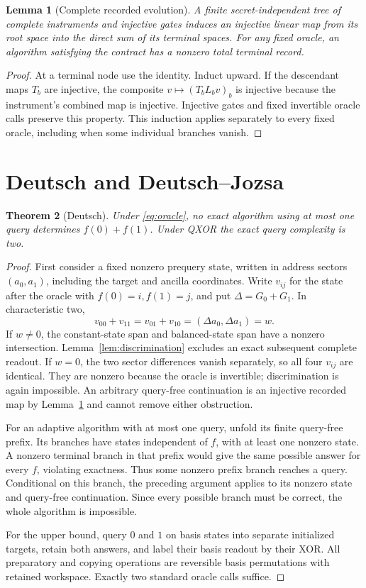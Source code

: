 \documentclass[11pt]{article}
\newtheorem{theorem}{Theorem}[section]
\newtheorem{lemma}[theorem]{Lemma}
\begin{document}
\begin{lemma}[Complete recorded evolution]\label{lem:record}
A finite secret-independent tree of complete instruments and injective gates induces an injective linear map from its root space into the direct sum of its terminal spaces. For any fixed oracle, an algorithm satisfying the contract has a nonzero total terminal record.
\end{lemma}
\begin{proof}
At a terminal node use the identity. Induct upward. If the descendant maps $T_b$ are injective, the composite $v\mapsto(T_bL_bv)_b$ is injective because the instrument's combined map is injective. Injective gates and fixed invertible oracle calls preserve this property. This induction applies separately to every fixed oracle, including when some individual branches vanish.
\end{proof}

\section{Deutsch and Deutsch--Jozsa}
\begin{theorem}[Deutsch]\label{thm:deutsch}
Under \eqref{eq:oracle}, no exact algorithm using at most one query determines $f(0)+f(1)$. Under QXOR the exact query complexity is two.
\end{theorem}
\begin{proof}
First consider a fixed nonzero prequery state, written in address sectors $(a_0,a_1)$, including the target and ancilla coordinates. Write $v_{ij}$ for the state after the oracle with $f(0)=i,f(1)=j$, and put $\Delta=G_0+G_1$. In characteristic two,
\[
 v_{00}+v_{11}=v_{01}+v_{10}
   =(\Delta a_0,\Delta a_1)=w.
\]
If $w\ne0$, the constant-state span and balanced-state span have a nonzero intersection. Lemma~\ref{lem:discrimination} excludes an exact subsequent complete readout. If $w=0$, the two sector differences vanish separately, so all four $v_{ij}$ are identical. They are nonzero because the oracle is invertible; discrimination is again impossible. An arbitrary query-free continuation is an injective recorded map by Lemma~\ref{lem:record} and cannot remove either obstruction.

For an adaptive algorithm with at most one query, unfold its finite query-free prefix. Its branches have states independent of $f$, with at least one nonzero state. A nonzero terminal branch in that prefix would give the same possible answer for every $f$, violating exactness. Thus some nonzero prefix branch reaches a query. Conditional on this branch, the preceding argument applies to its nonzero state and query-free continuation. Since every possible branch must be correct, the whole algorithm is impossible.

For the upper bound, query $0$ and $1$ on basis states into separate initialized targets, retain both answers, and label their basis readout by their XOR. All preparatory and copying operations are reversible basis permutations with retained workspace. Exactly two standard oracle calls suffice.
\end{proof}
\end{document}
